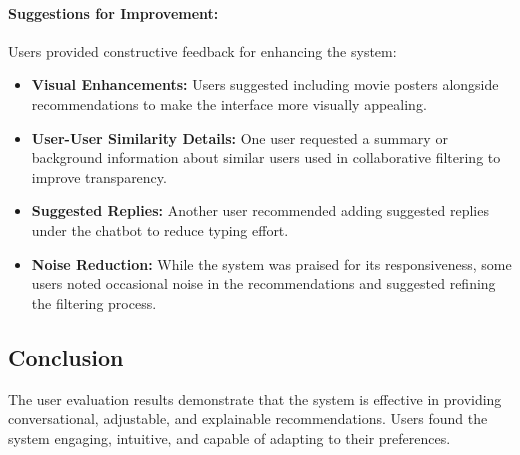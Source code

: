 \paragraph{Suggestions for Improvement:}  
Users provided constructive feedback for enhancing the system:
\begin{itemize}
    \item \textbf{Visual Enhancements:} Users suggested including movie posters alongside recommendations to make the interface more visually appealing.
    \item \textbf{User-User Similarity Details:} One user requested a summary or background information about similar users used in collaborative filtering to improve transparency.
    \item \textbf{Suggested Replies:} Another user recommended adding suggested replies under the chatbot to reduce typing effort.
    \item \textbf{Noise Reduction:} While the system was praised for its responsiveness, some users noted occasional noise in the recommendations and suggested refining the filtering process.
\end{itemize}

\subsection{Conclusion}
The user evaluation results demonstrate that the system is effective in providing conversational, adjustable, and explainable recommendations. 
Users found the system engaging, intuitive, and capable of adapting to their preferences.




